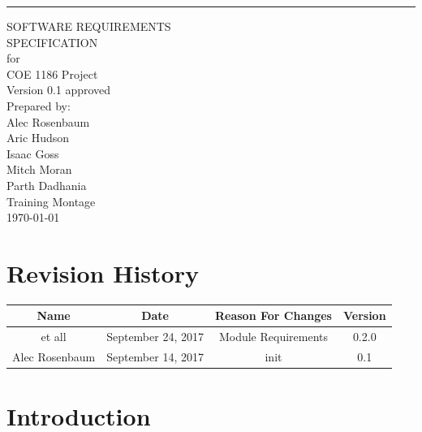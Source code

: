 \documentclass{scrreprt}
\date{}
\def\myversion{0.1 }
\begin{document}
\begin{flushright}
    \rule{16cm}{5pt}\vskip1cm
    \begin{bfseries}
        \Huge{SOFTWARE REQUIREMENTS\\ SPECIFICATION}\\
        \vspace{.9cm}
        for\\
        \vspace{.9cm}
        COE 1186 Project\\
        \vspace{.9cm}
        \LARGE{Version \myversion approved}\\
        \vspace{.9cm}
        Prepared by:\\
        Alec Rosenbaum\\
        Aric Hudson\\
        Isaac Goss\\
        Mitch Moran\\
        Parth Dadhania\\
        \vspace{1.9cm}
        Training Montage\\
        \vspace{.9cm}
        \today\\
    \end{bfseries}
\end{flushright}

\tableofcontents

\chapter*{Revision History}

\begin{center}
    \begin{tabular}{|c|c|c|c|}
        \hline
	    Name & Date & Reason For Changes & Version\\
        \hline
        et all & September 24, 2017 & Module Requirements & 0.2.0\\
        \hline
	    Alec Rosenbaum & September 14, 2017 & init & 0.1\\
        \hline
    \end{tabular}
\end{center}

\chapter{Introduction}
\end{document}
